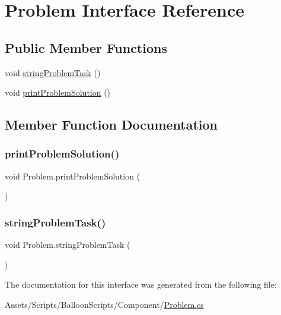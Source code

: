 \hypertarget{interfaceProblem}{}\section{Problem Interface Reference}
\label{interfaceProblem}
\subsection*{Public Member Functions}
\begin{DoxyCompactItemize}
\item 
void \hyperlink{interfaceProblem_add905385067d91a7614c1c1c57129e10}{string\+Problem\+Task} ()
\item 
void \hyperlink{interfaceProblem_a689aee9674d192aa7e67f8558a5e0925}{print\+Problem\+Solution} ()
\end{DoxyCompactItemize}


\subsection{Member Function Documentation}
\mbox{\label{interfaceProblem_a689aee9674d192aa7e67f8558a5e0925}} 
\subsubsection{\texorpdfstring{print\+Problem\+Solution()}{printProblemSolution()}}
{\footnotesize\ttfamily void Problem.\+print\+Problem\+Solution (\begin{DoxyParamCaption}{ }\end{DoxyParamCaption})}

\mbox{\label{interfaceProblem_add905385067d91a7614c1c1c57129e10}} 
\subsubsection{\texorpdfstring{string\+Problem\+Task()}{stringProblemTask()}}
{\footnotesize\ttfamily void Problem.\+string\+Problem\+Task (\begin{DoxyParamCaption}{ }\end{DoxyParamCaption})}



The documentation for this interface was generated from the following file\+:\begin{DoxyCompactItemize}
\item 
Assets/\+Scripts/\+Balloon\+Scripts/\+Component/\hyperlink{Problem_8cs}{Problem.\+cs}\end{DoxyCompactItemize}
